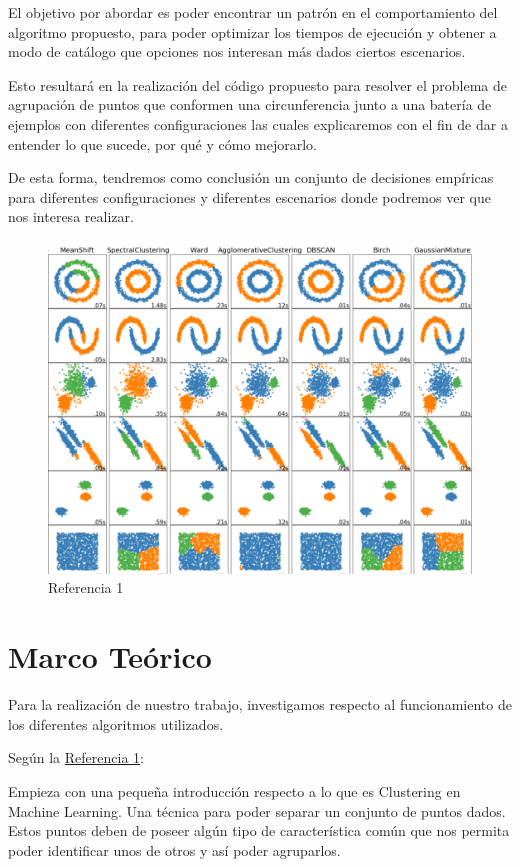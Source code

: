 \documentclass[conference,a4paper]{IEEEtran}
\begin{document}
El objetivo por abordar es poder encontrar un patrón en el comportamiento del algoritmo propuesto, para poder optimizar los tiempos de ejecución y obtener a modo de catálogo que opciones nos interesan más dados ciertos escenarios.

Esto resultará en la realización del código propuesto para resolver el problema de agrupación de puntos que conformen una circunferencia junto a una batería de ejemplos con diferentes configuraciones las cuales explicaremos con el fin de dar a entender lo que sucede, por qué y cómo mejorarlo.

\newpage
De esta forma, tendremos como conclusión un conjunto de decisiones empíricas para diferentes configuraciones y diferentes escenarios donde podremos ver que nos interesa realizar.

\begin{figure}[H]
\centering
\includegraphics[scale=0.3]{portada.png}
\caption{Referencia 1}
\end{figure}

\clearpage
\section{Marco Teórico}

Para la realización de nuestro trabajo, investigamos respecto al funcionamiento de los diferentes algoritmos utilizados.

Según la  \hyperref[bib:georgeSeif]{Referencia 1}:

Empieza con una pequeña introducción respecto a lo que es Clustering en Machine Learning. Una técnica para poder separar un conjunto de puntos dados. Estos puntos deben de poseer algún tipo de característica común que nos permita poder identificar unos de otros y así poder agruparlos.
\end{document}
